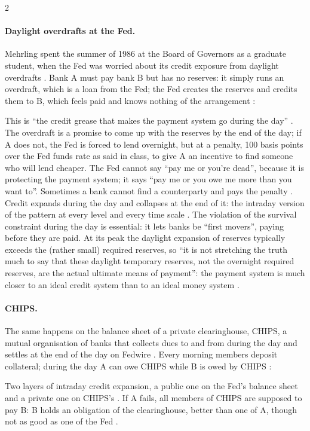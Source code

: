 \begin{paracol}{2}
\paragraph{Daylight overdrafts at the Fed.} Mehrling spent the summer of 1986 at the Board of Governors as a graduate student, when the Fed was worried
about its credit exposure from daylight overdrafts . Bank A must pay bank B but has no reserves: it simply runs an overdraft,
which is a loan from the Fed; the Fed creates the reserves and credits them to B, which feels paid and knows nothing of the arrangement
:
\begin{taccts}
\quad
{}\quad
{}
\end{taccts}
This is ``the credit grease that makes the payment system go during the day'' . The overdraft is a promise to come up with the reserves by
the end of the day; if A does not, the Fed is forced to lend overnight, but at a penalty, 100 basis points over the Fed funds rate as said in class, to give
A an incentive to find someone who will lend cheaper. The Fed cannot say ``pay me or you're dead'', because it is protecting the payment system; it says
``pay me or you owe me more than you want to''. Sometimes a bank cannot find a counterparty and pays the penalty .
Credit expands during the day and collapses at the end of it: the intraday version of the pattern at every level and every time scale .
The violation of the survival constraint during the day is essential: it lets banks be ``first movers'', paying before they are paid. At its peak the daylight
expansion of reserves typically exceeds the (rather small) required reserves, so ``it is not stretching the truth much to say that these daylight temporary
reserves, not the overnight required reserves, are the actual ultimate means of payment'': the payment system is much closer to an ideal credit system than to
an ideal money system .

\paragraph{CHIPS.} The same happens on the balance sheet of a private clearinghouse, CHIPS, a mutual organisation of banks that collects dues to and from
during the day and settles at the end of the day on Fedwire . Every morning members deposit collateral; during the day
A can owe CHIPS while B is owed by CHIPS :
\begin{taccts}
\quad
{}\quad
{}
\end{taccts}
Two layers of intraday credit expansion, a public one on the Fed's balance sheet and a private one on CHIPS's . If A fails, all members of CHIPS
are supposed to pay B: B holds an obligation of the clearinghouse, better than one of A, though not as good as one of the Fed .


\end{paracol}
